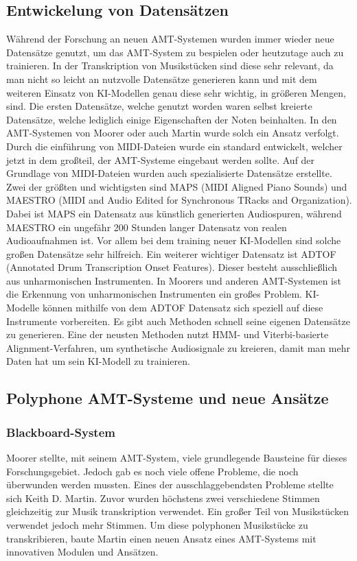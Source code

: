 \subsection{Entwickelung von Datensätzen}
Während der Forschung an neuen AMT-Systemen wurden immer wieder neue Datensätze genutzt,
um das AMT-System zu bespielen oder heutzutage auch zu trainieren.
In der Transkription von Musikstücken sind diese sehr relevant,
da man nicht so leicht an nutzvolle Datensätze generieren kann und
mit dem weiteren Einsatz von KI-Modellen genau diese sehr wichtig, in größeren Mengen, sind.
Die ersten Datensätze, welche genutzt worden waren selbst kreierte Datensätze,
welche lediglich einige Eigenschaften der Noten beinhalten.
In den AMT-Systemen von Moorer\cite{Moorer1977} oder auch Martin\cite{Martin1996} wurde solch ein Ansatz verfolgt.
Durch die einführung von MIDI-Dateien wurde ein standard entwickelt,
welcher jetzt in dem großteil, der AMT-Systeme eingebaut werden sollte.
Auf der Grundlage von MIDI-Dateien wurden auch spezialisierte Datensätze erstellte.
Zwei der größten und wichtigsten sind MAPS (MIDI Aligned Piano Sounds) und
MAESTRO (MIDI and Audio Edited for Synchronous TRacks and Organization).
Dabei ist MAPS ein Datensatz aus künstlich generierten Audiospuren,
während MAESTRO ein ungefähr 200 Stunden langer Datensatz von realen Audioaufnahmen ist.
Vor allem bei dem training neuer KI-Modellen sind solche großen Datensätze sehr hilfreich.
Ein weiterer wichtiger Datensatz ist ADTOF (Annotated Drum Transcription Onset Features).
Dieser besteht ausschließlich aus unharmonischen Instrumenten.
In Moorers und anderen AMT-Systemen ist die Erkennung von unharmonischen Instrumenten ein großes Problem.
KI-Modelle können mithilfe von dem ADTOF Datensatz sich speziell auf diese Instrumente vorbereiten.
Es gibt auch Methoden schnell seine eigenen Datensätze zu generieren.
Eine der neusten Methoden nutzt HMM- und Viterbi-basierte Alignment-Verfahren,
um synthetische Audiosignale zu kreieren, damit man mehr Daten hat um sein KI-Modell zu trainieren.
\cite{joysingh2019development}

\subsection{Polyphone AMT-Systeme und neue Ansätze}
\subsubsection{Blackboard-System}
Moorer stellte, mit seinem AMT-System, viele grundlegende Bausteine für dieses Forschungsgebiet.
Jedoch gab es noch viele offene Probleme, die noch überwunden werden mussten.
Eines der ausschlaggebendsten Probleme stellte sich Keith D. Martin.
\cite{Martin1996}
Zuvor wurden höchstens zwei verschiedene Stimmen gleichzeitig zur Musik transkription verwendet.
Ein großer Teil von Musikstücken verwendet jedoch mehr Stimmen.
Um diese polyphonen Musikstücke zu transkribieren,
baute Martin einen neuen Ansatz eines AMT-Systems mit innovativen Modulen und Ansätzen.

